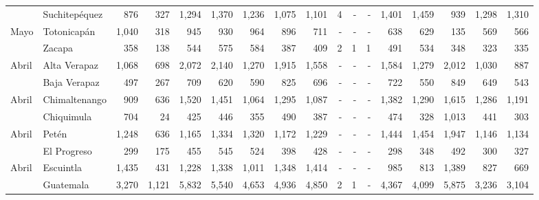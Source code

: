\begin{landscape}
\begin{center}
\begin{longtable}{llrrrrrrrrrrrrrrr}
			\rowcolor{color1!5!white}\multicolumn{1}{l}{	\footnotesize	 Mayo 	}&	 Suchitepéquez 	&	 876 	&	 327 	&	 1,294 	&	 1,370 	&	 1,236 	&	 1,075 	&	 1,101 	&	 4 	&	 -   	&	 -   	&	 1,401 	&	 1,459 	&	 939 	&	 1,298 	&	 1,310 	\\
			\multicolumn{1}{l}{	\footnotesize	 Mayo 	}&	 Totonicapán 	&	 1,040 	&	 318 	&	 945 	&	 930 	&	 964 	&	 896 	&	 711 	&	 -   	&	 -   	&	 -   	&	 638 	&	 629 	&	 135 	&	 569 	&	 566 	\\
			\rowcolor{color1!5!white}\multicolumn{1}{l}{	\footnotesize	 Mayo 	}&	 Zacapa 	&	 358 	&	 138 	&	 544 	&	 575 	&	 584 	&	 387 	&	 409 	&	 2 	&	 1 	&	 1 	&	 491 	&	 534 	&	 348 	&	 323 	&	 335 	\\
			\multicolumn{1}{l}{	\footnotesize	 Abril 	}&	 Alta Verapaz 	&	 1,068 	&	 698 	&	 2,072 	&	 2,140 	&	 1,270 	&	 1,915 	&	 1,558 	&	 -   	&	 -   	&	 -   	&	 1,584 	&	 1,279 	&	 2,012 	&	 1,030 	&	 887 	\\
			\rowcolor{color1!5!white}\multicolumn{1}{l}{	\footnotesize	 Abril 	}&	 Baja Verapaz 	&	 497 	&	 267 	&	 709 	&	 620 	&	 590 	&	 825 	&	 696 	&	 -   	&	 -   	&	 -   	&	 722 	&	 550 	&	 849 	&	 649 	&	 543 	\\
			\multicolumn{1}{l}{	\footnotesize	 Abril 	}&	 Chimaltenango 	&	 909 	&	 636 	&	 1,520 	&	 1,451 	&	 1,064 	&	 1,295 	&	 1,087 	&	 -   	&	 -   	&	 -   	&	 1,382 	&	 1,290 	&	 1,615 	&	 1,286 	&	 1,191 	\\
			\rowcolor{color1!5!white}\multicolumn{1}{l}{	\footnotesize	 Abril 	}&	 Chiquimula 	&	 704 	&	 24 	&	 425 	&	 446 	&	 355 	&	 490 	&	 387 	&	 -   	&	 -   	&	 -   	&	 474 	&	 328 	&	 1,013 	&	 441 	&	 303 	\\
			\multicolumn{1}{l}{	\footnotesize	 Abril 	}&	 Petén 	&	 1,248 	&	 636 	&	 1,165 	&	 1,334 	&	 1,320 	&	 1,172 	&	 1,229 	&	 -   	&	 -   	&	 -   	&	 1,444 	&	 1,454 	&	 1,947 	&	 1,146 	&	 1,134 	\\
			\rowcolor{color1!5!white}\multicolumn{1}{l}{	\footnotesize	 Abril 	}&	 El Progreso 	&	 299 	&	 175 	&	 455 	&	 545 	&	 524 	&	 398 	&	 428 	&	 -   	&	 -   	&	 -   	&	 298 	&	 348 	&	 492 	&	 300 	&	 327 	\\
			\multicolumn{1}{l}{	\footnotesize	 Abril 	}&	 Escuintla 	&	 1,435 	&	 431 	&	 1,228 	&	 1,338 	&	 1,011 	&	 1,348 	&	 1,414 	&	 -   	&	 -   	&	 -   	&	 985 	&	 813 	&	 1,389 	&	 827 	&	 669 	\\
			\rowcolor{color1!5!white}\multicolumn{1}{l}{	\footnotesize	 Abril 	}&	 Guatemala 	&	 3,270 	&	 1,121 	&	 5,832 	&	 5,540 	&	 4,653 	&	 4,936 	&	 4,850 	&	 2 	&	 1 	&	 -   	&	 4,367 	&	 4,099 	&	 5,875 	&	 3,236 	&	 3,104 	\\

\end{longtable}
\end{center}
\end{landscape}
